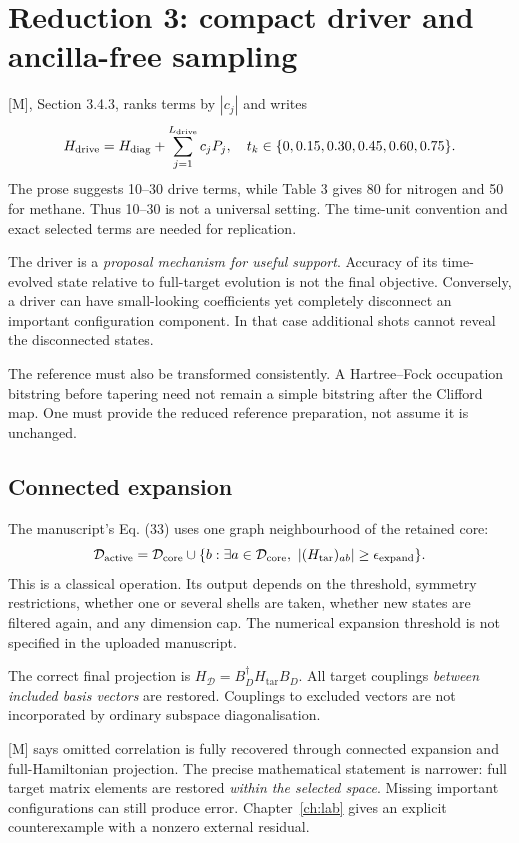 \documentclass[11pt,a4paper,oneside]{report}
\newcommand{\Ht}{H_{\mathrm{tar}}}
\newcommand{\Hd}{H_{\mathrm{drive}}}
\newcommand{\HD}{H_{\mathcal D}}
\newcommand{\Dset}{\mathcal D}
\begin{document}
\section{Reduction 3: compact driver and ancilla-free sampling}
\begin{sourcebox}
{[M]}, Section 3.4.3, ranks terms by $|c_j|$ and writes
\[
\Hd=H_{\rm diag}+\sum_{j=1}^{L_{\rm drive}}c_jP_j,
\quad t_k\in\{0,0.15,0.30,0.45,0.60,0.75\}.
\]
The prose suggests 10--30 drive terms, while Table 3 gives 80 for nitrogen and 50 for methane. Thus 10--30 is not a universal setting. The time-unit convention and exact selected terms are needed for replication.
\end{sourcebox}
The driver is a \emph{proposal mechanism for useful support}. Accuracy of its time-evolved state relative to full-target evolution is not the final objective. Conversely, a driver can have small-looking coefficients yet completely disconnect an important configuration component. In that case additional shots cannot reveal the disconnected states.

The reference must also be transformed consistently. A Hartree--Fock occupation bitstring before tapering need not remain a simple bitstring after the Clifford map. One must provide the reduced reference preparation, not assume it is unchanged.

\subsection{Connected expansion}
The manuscript's Eq. (33) uses one graph neighbourhood of the retained core:
\begin{equation}\label{eq:expand}
\Dset_{\rm active}=\Dset_{\rm core}\cup
\{b:\exists a\in\Dset_{\rm core},\ |(\Ht)_{ab}|\ge\epsilon_{\rm expand}\}.
\end{equation}
This is a classical operation. Its output depends on the threshold, symmetry restrictions, whether one or several shells are taken, whether new states are filtered again, and any dimension cap. The numerical expansion threshold is not specified in the uploaded manuscript.

The correct final projection is $\HD=B_D^\dagger\Ht B_D$. All target couplings \emph{between included basis vectors} are restored. Couplings to excluded vectors are not incorporated by ordinary subspace diagonalisation.

\begin{caution}
{[M]} says omitted correlation is fully recovered through connected expansion and full-Hamiltonian projection. The precise mathematical statement is narrower: full target matrix elements are restored \emph{within the selected space}. Missing important configurations can still produce error. Chapter~\ref{ch:lab} gives an explicit counterexample with a nonzero external residual.
\end{caution}
\end{document}
